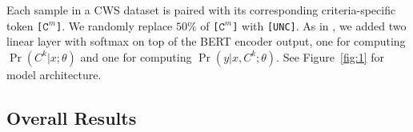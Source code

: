 \documentclass[11pt]{article}
\newcommand{\UNC}{\texttt{[UNC]}}
\newcommand{\Ck}[1]{\texttt{[\(\mathtt{C}^{#1}\)]}}
\begin{document}
Each sample in a CWS dataset is paired with its corresponding criteria-specific token \Ck{m}.
We randomly replace \(50\%\) of \Ck{m} with \UNC.
As in \cite{devlin-etal-2019-bert}, we added two linear layer with softmax on top of the BERT encoder output, one for computing \(\Pr(C^k | x ; \theta)\) and one for computing \(\Pr(y | x, C^k ; \theta)\).
See Figure~\ref{fig:1} for model architecture.

\subsection{Overall Results}

\begin{table}[t]
  \caption{F1-score (in percentage) on all five CWS datasets.
    F1-scores other than ours are directly recorded from their papers.
    \textbf{Avg-4}: Average F1-score on AS, CITYU, MSRA and PKU.
    \textbf{Avg-5}: Average F1-score on all five datasets.
    \dag: Manually choosing criterion-specific token for each input.
    \ddag: Automatically choosing criterion for each input by giving \UNC.
  }
  \label{tab:f1}
  \centering
\end{table}
\end{document}
